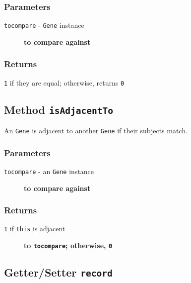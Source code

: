 \subsubsection*{Parameters\label{Parameters}}
\begin{description}

\item[{\texttt{tocompare} - \texttt{Gene} instance}] \textbf{to compare against}\end{description}
\subsubsection*{Returns\label{Returns}}


\texttt{1} if they are equal; otherwise, returns \texttt{0}

\subsection*{Method \texttt{isAdjacentTo}\label{Method_isAdjacentTo}}


An \texttt{Gene} is adjacent to another \texttt{Gene} if their subjects match.

\subsubsection*{Parameters\label{Parameters}}
\begin{description}

\item[{\texttt{tocompare} - an \texttt{Gene} instance}] \textbf{to compare against}\end{description}
\subsubsection*{Returns\label{Returns}}
\begin{description}

\item[{\texttt{1} if \texttt{this} is adjacent}] \textbf{to \texttt{tocompare}; otherwise, \texttt{0}}\end{description}
\subsection*{Getter/Setter \texttt{record}\label{Getter_Setter_record}}


